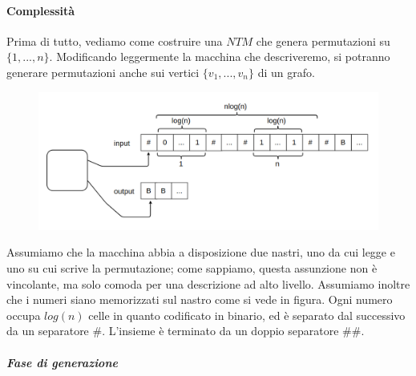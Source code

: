 \paragraph{Complessità} Prima di tutto, vediamo come costruire una $NTM$ che genera permutazioni su $\{1, ..., n\}$. Modificando leggermente la macchina che descriveremo, si potranno generare permutazioni anche sui vertici $\{v_1, ..., v_n\}$ di un grafo.
\begin{figure}[H]
	\centering
	\includegraphics[width=\textwidth]{automa-permutazione}
\end{figure}

Assumiamo che la macchina abbia a disposizione due nastri, uno da cui legge e uno su cui scrive la permutazione; come sappiamo, questa assunzione non è vincolante, ma solo comoda per una descrizione ad alto livello. Assumiamo inoltre che i numeri siano memorizzati sul nastro come si vede in figura. Ogni numero occupa $log(n)$ celle in quanto codificato in binario, ed è separato dal successivo da un separatore $\#$. L'insieme è terminato da un doppio separatore $\#\#$.

\subparagraph{Fase di generazione}

